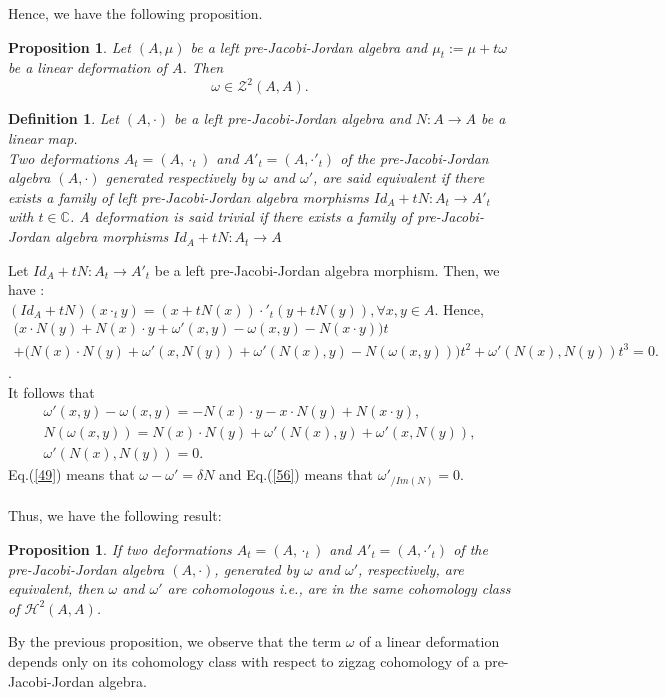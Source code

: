 \documentclass[12pt]{amsart}
\newtheorem{definition}[Theorem]{Definition}
\newtheorem{proposition}[Theorem]{Proposition}
\begin{document}
	Hence, we have the following proposition.
	\begin{proposition}\label{an1}
	Let $ (A,\mu) $ be a left pre-Jacobi-Jordan algebra and $\mu_t:=\mu +t\omega$ be a linear deformation of $A$. Then 
	$$\omega\in\mathcal{Z}^2(A,A).$$
	\end{proposition}
	\begin{definition}\label{D14} Let $ (A,\cdot) $ be a left pre-Jacobi-Jordan algebra and $ N : A\to A$ be a linear map.\\
		Two deformations $ A_{t}=(A,\cdot_{t}) $ and $ A'_{t}=(A,\cdot'_{t}) $ of the pre-Jacobi-Jordan algebra $ (A,\cdot) $ generated respectively by $ \omega $ and $ \omega' $, are said  equivalent if there exists a family of left pre-Jacobi-Jordan algebra  morphisms $ Id_{A}+tN : A_{t}\to A'_{t} $ with $t\in\mathbb{C}$. A deformation is said trivial if there exists a family of pre-Jacobi-Jordan algebra  morphisms $ Id_{A}+tN : A_{t}\to A $ 
	\end{definition}
	Let $ Id_{A}+tN : A_{t}\to A'_{t} $ be a left pre-Jacobi-Jordan algebra  morphism. Then, we have :\\
	$
	(Id_{A}+tN )(x\cdot_{t} y)=(x+tN(x))\cdot'_{t}(y+tN(y)),\forall x,y\in A  $. Hence,\\
	$ \begin{array}{lll}
		\bigg(x\cdot N(y)+N(x)\cdot y+\omega'(x,y)-\omega(x,y)-N(x\cdot y)\bigg)t\\
		+\bigg(N(x)\cdot N(y)+\omega'(x,N(y))+\omega'(N(x),y)-N(\omega(x,y))\bigg)t^{2}+
		\omega'(N(x),N(y))t^{3}=0.
	\end{array} $.\\ 
	It follows that
	\begin{eqnarray}
		\label{49}
		\omega'(x,y)-\omega(x,y)=-N(x)\cdot y-x\cdot N(y)+N(x\cdot y),\\
		\label{50}
		N(\omega(x,y))=N(x)\cdot N(y)+\omega'(N(x),y)+\omega'(x,N(y)),\\
		\label{56}
		\omega'(N(x),N(y))=0.
	\end{eqnarray}
	Eq.(\ref{49}) means that $ \omega-\omega'=\delta N $ and Eq.(\ref{56}) means that $ \omega'_{/Im(N)}=0$.\\\\
	Thus, we have the following result:
	\begin{proposition}\label{an2}
		If two deformations  $A_{t}=(A,\cdot_{t}) $ and $ A'_{t}=(A,\cdot'_{t}) $ of the pre-Jacobi-Jordan algebra $ (A,\cdot) $, generated by $ \omega $ and $ \omega' $, respectively, are equivalent, then $ \omega $ and $ \omega' $ are cohomologous i.e., are in the same cohomology class of $ \mathcal{H}^{2}(A,A) $.  	
	\end{proposition}
By the previous proposition, we observe that the  term $\omega $ of a linear deformation depends only on its cohomology class with respect
to zigzag cohomology of a pre-Jacobi-Jordan algebra.\\
\end{document}
